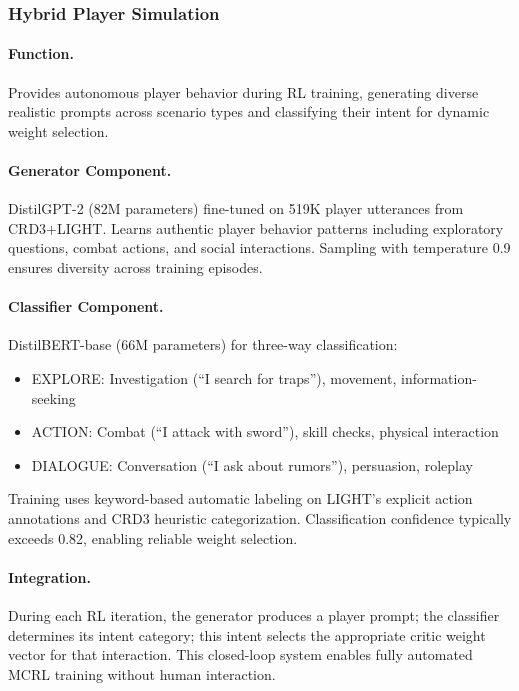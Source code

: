 \documentclass[11pt]{article}
\begin{document}
\subsubsection{Hybrid Player Simulation}

\paragraph{Function.} Provides autonomous player behavior during RL training, generating diverse realistic prompts across scenario types and classifying their intent for dynamic weight selection.

\paragraph{Generator Component.} DistilGPT-2 (82M parameters) fine-tuned on 519K player utterances from CRD3+LIGHT. Learns authentic player behavior patterns including exploratory questions, combat actions, and social interactions. Sampling with temperature 0.9 ensures diversity across training episodes.

\paragraph{Classifier Component.} DistilBERT-base (66M parameters) for three-way classification:
\begin{itemize}
\item EXPLORE: Investigation (``I search for traps''), movement, information-seeking
\item ACTION: Combat (``I attack with sword''), skill checks, physical interaction
\item DIALOGUE: Conversation (``I ask about rumors''), persuasion, roleplay
\end{itemize}

Training uses keyword-based automatic labeling on LIGHT's explicit action annotations and CRD3 heuristic categorization. Classification confidence typically exceeds 0.82, enabling reliable weight selection.

\paragraph{Integration.} During each RL iteration, the generator produces a player prompt; the classifier determines its intent category; this intent selects the appropriate critic weight vector for that interaction. This closed-loop system enables fully automated MCRL training without human interaction.
\end{document}
